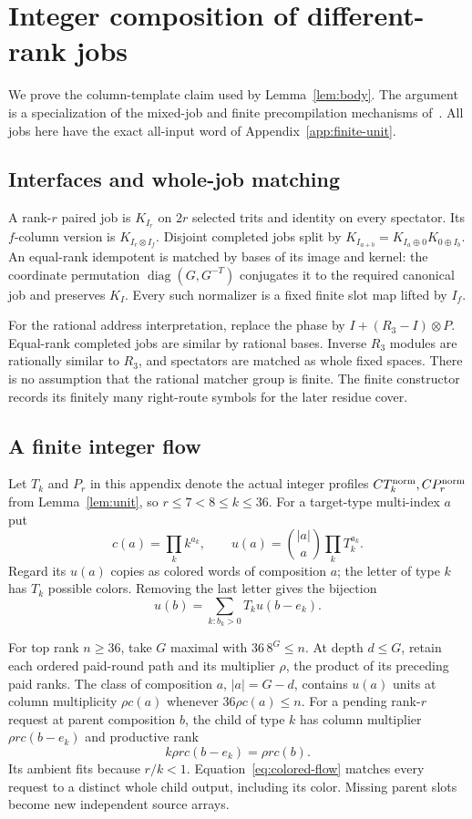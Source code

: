 \section{Integer composition of different-rank jobs}
\label{app:mixed-compiler}
We prove the column-template claim used by Lemma~\ref{lem:body}.
The argument is a specialization of the mixed-job and finite
precompilation mechanisms of~\cite{sussman,mixed-precompile}.
All jobs here have the exact all-input word of
Appendix~\ref{app:finite-unit}.

\subsection{Interfaces and whole-job matching}
A rank-$r$ paired job is $K_{I_r}$ on $2r$ selected trits and identity
on every spectator. Its $f$-column version is $K_{I_r\otimes I_f}$.
Disjoint completed jobs split by
$K_{I_{a+b}}=K_{I_a\oplus0}K_{0\oplus I_b}$.
An equal-rank idempotent is matched by bases of its image and kernel:
the coordinate permutation $\operatorname{diag}(G,G^{-T})$ conjugates
it to the required canonical job and preserves $K_I$. Every such
normalizer is a fixed finite slot map lifted by $I_f$.

For the rational address interpretation, replace the phase by
$I+(R_3-I)\otimes P$. Equal-rank completed jobs are similar by
rational bases. Inverse $R_3$ modules are rationally similar to
$R_3$, and spectators are matched as whole fixed spaces. There is
no assumption that the rational matcher group is finite. The finite
constructor records its finitely many right-route symbols for the
later residue cover.

\subsection{A finite integer flow}
Let $T_k$ and $P_r$ in this appendix denote the actual integer profiles
$C T_k^{\rm norm},C P_r^{\rm norm}$ from Lemma~\ref{lem:unit}, so
$r\le7<8\le k\le36$. For a target-type multi-index $a$ put
\[
 c(a)=\prod_k k^{a_k},\qquad
 u(a)=\binom{|a|}{a}\prod_k T_k^{a_k}.
\]
Regard its $u(a)$ copies as colored words of composition $a$; the
letter of type $k$ has $T_k$ possible colors. Removing the last
letter gives the bijection
\begin{equation}
 u(b)=\sum_{k:b_k>0}T_k u(b-e_k).
 \label{eq:colored-flow}
\end{equation}

For top rank $n\ge36$, take $G$ maximal with $36\,8^G\le n$.
At depth $d\le G$, retain each ordered paid-round path and its
multiplier $\rho$, the product of its preceding paid ranks. The
class of composition $a$, $|a|=G-d$, contains $u(a)$ units at column
multiplicity $\rho c(a)$ whenever $36\rho c(a)\le n$.
For a pending rank-$r$ request at parent composition $b$, the
child of type $k$ has column multiplier $\rho r c(b-e_k)$ and
productive rank
\[
 k\rho r c(b-e_k)=\rho r c(b).
\]
Its ambient fits because $r/k<1$. Equation~\eqref{eq:colored-flow}
matches every request to a distinct whole child output, including its
color. Missing parent slots become new independent source arrays.

